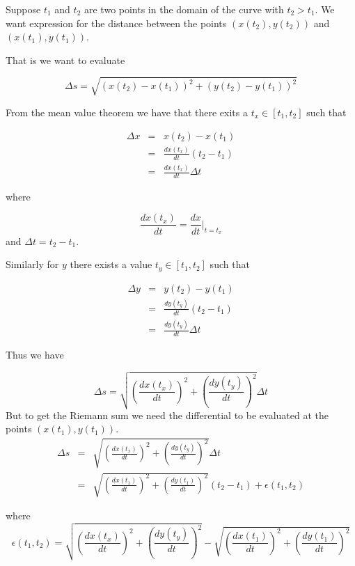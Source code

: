 \documentclass[13pt]{article}
\title{}
\author{}
\begin{document}
\maketitle

Suppose $t_1$ and $t_2$ are two points in the domain of the curve with $t_2 > t_1$. We want expression for the distance between the points $(x(t_2), y(t_2))$ and $(x(t_1), y(t_1))$.


That is we want to evaluate

\[
	\Delta s = \sqrt{ \left( x(t_2) - x(t_1) \right)^2 + \left( y(t_2) - y(t_1) \right)^2 }
\]

From the mean value theorem we have that there exits a $t_x \in [t_1, t_2]$ such that

\begin{eqnarray*}
	\Delta x &=& x(t_2) - x(t_1) \\
	         &=& \frac{dx(t_x)}{dt}(t_2-t_1) \\
	         &=& \frac{dx(t_x)}{dt} \Delta t
\end{eqnarray*}

where 

\[
\frac{dx(t_x)}{dt} = \frac{dx}{dt}\bigg|_{t=t_x}
\]
and $\Delta t = t_2-t_1$.

Similarly for $y$ there exists a value $t_y \in [t_1, t_2]$ such that 

\begin{eqnarray*}
	\Delta y &=& y(t_2) - y(t_1) \\
	&=& \frac{dy(t_y)}{dt}(t_2-t_1) \\
	&=& \frac{dy(t_y)}{dt} \Delta t
\end{eqnarray*}

Thus we have

\[
	\Delta s = \sqrt{ \left(  \frac{dx(t_x)}{dt} \right)^2 + \left( \frac{dy(t_y)}{dt} \right)^2 } \Delta t
\]
But to get the Riemann sum we need the differential to be evaluated at the points $(x(t_1), y(t_1))$.
\begin{eqnarray*}
\Delta s &=& \sqrt{ \left(  \frac{dx(t_x)}{dt} \right)^2 + \left( \frac{dy(t_y)}{dt} \right)^2 } \Delta t \\
         &=& \sqrt{ \left(  \frac{dx(t_1)}{dt} \right)^2 + \left( \frac{dy(t_1)}{dt} \right)^2 } (t_2-t_1) + \epsilon(t_1, t_2)
\end{eqnarray*}

where 
\[
	\epsilon(t_1, t_2) = \sqrt{ \left(  \frac{dx(t_x)}{dt} \right)^2 + \left( \frac{dy(t_y)}{dt} \right)^2 } - \sqrt{ \left(  \frac{dx(t_1)}{dt} \right)^2 + \left( \frac{dy(t_1)}{dt} \right)^2 }
\]
\end{document}
